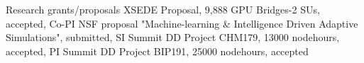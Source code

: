 \begin{rubric}{Research grants/proposals}
\entry*[\hspace{1.05cm}2021]%
  XSEDE Proposal, 9,888 GPU Bridges-2 SUs, accepted, Co-PI
\entry*[2020]%
  NSF proposal "Machine-learning \& Intelligence Driven Adaptive Simulations", submitted, SI
\entry*[2020]%
  Summit DD Project CHM179, 13000 nodehours, accepted, PI
\entry*[2019]%
  Summit DD Project BIP191, 25000 nodehours, accepted 


\end{rubric}